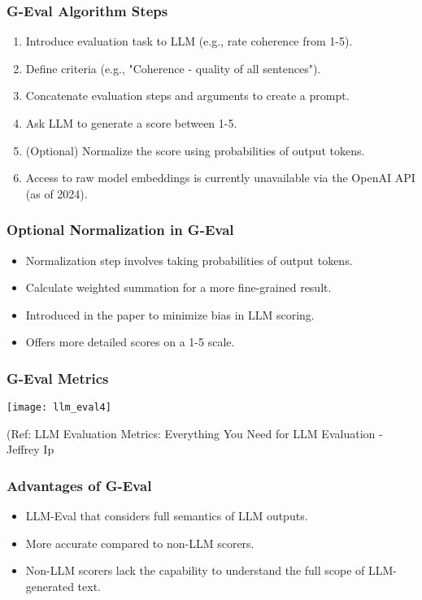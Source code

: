 \begin{frame}[fragile]\frametitle{G-Eval Algorithm Steps}
  \begin{enumerate}
    \item Introduce evaluation task to LLM (e.g., rate coherence from 1-5).
    \item Define criteria (e.g., "Coherence - quality of all sentences").
    \item Concatenate evaluation steps and arguments to create a prompt.
    \item Ask LLM to generate a score between 1-5.
    \item (Optional) Normalize the score using probabilities of output tokens.
    \item Access to raw model embeddings is currently unavailable via the OpenAI API (as of 2024).
  \end{enumerate}
\end{frame}

\begin{frame}[fragile]\frametitle{Optional Normalization in G-Eval}
  \begin{itemize}
    \item Normalization step involves taking probabilities of output tokens.
    \item Calculate weighted summation for a more fine-grained result.
    \item Introduced in the paper to minimize bias in LLM scoring.
    \item Offers more detailed scores on a 1-5 scale.
  \end{itemize}
\end{frame}

\begin{frame}[fragile]\frametitle{G-Eval Metrics}


\begin{center}
\texttt{[image: llm\_eval4]}
\end{center}		
		
{\tiny (Ref: LLM Evaluation Metrics: Everything You Need for LLM Evaluation - Jeffrey Ip}
			
			
\end{frame}

\begin{frame}[fragile]\frametitle{Advantages of G-Eval}
  \begin{itemize}
    \item LLM-Eval that considers full semantics of LLM outputs.
    \item More accurate compared to non-LLM scorers.
    \item Non-LLM scorers lack the capability to understand the full scope of LLM-generated text.
  \end{itemize}
\end{frame}

